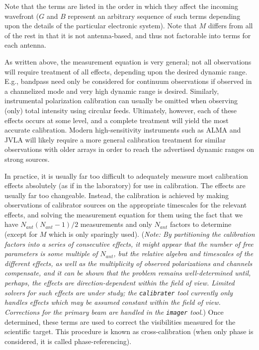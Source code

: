 Note that the terms are listed in the order in which they affect the
incoming wavefront ($G$ and $B$ represent an arbitrary sequence of
such terms depending upon the details of the particular electronic
system). Note that $M$ differs from all of the rest in that it is not
antenna-based, and thus not factorable into terms for each antenna. 

As written above, the measurement equation is very general; not all
observations will require treatment of all effects, depending upon the
desired dynamic range. E.g., bandpass need only be considered for
continuum observations if observed in a channelized mode and very high
dynamic range is desired. Similarly, instrumental polarization
calibration can usually be omitted when observing (only) total
intensity using circular feeds. Ultimately, however, each of these
effects occurs at some level, and a complete treatment will yield the
most accurate calibration. Modern high-sensitivity instruments such as
ALMA and JVLA will likely require a more general calibration treatment
for similar observations with older arrays in order to reach the
advertised dynamic ranges on strong sources. 

In practice, it is usually far too difficult to adequately measure
most calibration effects absolutely (as if in the laboratory) for use
in calibration. The effects are usually far too changeable. Instead,
the calibration is achieved by making observations of calibrator
sources on the appropriate timescales for the relevant effects, and
solving the measurement equation for them using the fact that we have
$N_{ant}(N_{ant}-1)/2$ measurements and only $N_{ant}$ factors to
determine (except for $M$ which is only sparingly used). ({\it Note: By
partitioning the calibration factors into a series of consecutive
effects, it might appear that the number of free parameters is some
multiple of $N_{ant}$, but the relative algebra and timescales of the
different effects, as well as the  multiplicity of observed
polarizations and channels compensate, and it can be shown that the
problem remains well-determined until, perhaps, the effects are
direction-dependent within the field of view. Limited solvers for such
effects are under study; the {\tt calibrater} tool currently only handles
effects which may be assumed constant within the field of
view. Corrections for the primary beam are handled in the {\tt imager}
tool.}) Once determined, these terms are used to correct the
visibilities measured for the scientific target. This procedure is
known as cross-calibration (when only phase is considered, it is
called phase-referencing). 

